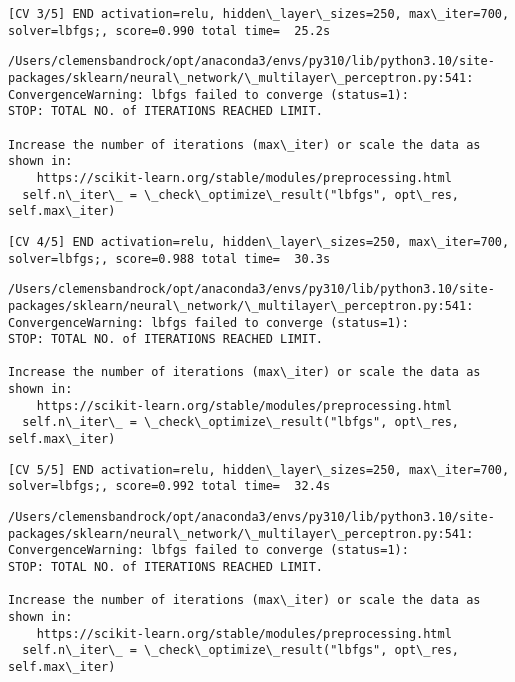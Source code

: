 \documentclass[11pt]{article}
\begin{document}
    \begin{Verbatim}[commandchars=\\\{\}]
[CV 3/5] END activation=relu, hidden\_layer\_sizes=250, max\_iter=700,
solver=lbfgs;, score=0.990 total time=  25.2s
    \end{Verbatim}

    \begin{Verbatim}[commandchars=\\\{\}]
/Users/clemensbandrock/opt/anaconda3/envs/py310/lib/python3.10/site-
packages/sklearn/neural\_network/\_multilayer\_perceptron.py:541:
ConvergenceWarning: lbfgs failed to converge (status=1):
STOP: TOTAL NO. of ITERATIONS REACHED LIMIT.

Increase the number of iterations (max\_iter) or scale the data as shown in:
    https://scikit-learn.org/stable/modules/preprocessing.html
  self.n\_iter\_ = \_check\_optimize\_result("lbfgs", opt\_res, self.max\_iter)
    \end{Verbatim}

    \begin{Verbatim}[commandchars=\\\{\}]
[CV 4/5] END activation=relu, hidden\_layer\_sizes=250, max\_iter=700,
solver=lbfgs;, score=0.988 total time=  30.3s
    \end{Verbatim}

    \begin{Verbatim}[commandchars=\\\{\}]
/Users/clemensbandrock/opt/anaconda3/envs/py310/lib/python3.10/site-
packages/sklearn/neural\_network/\_multilayer\_perceptron.py:541:
ConvergenceWarning: lbfgs failed to converge (status=1):
STOP: TOTAL NO. of ITERATIONS REACHED LIMIT.

Increase the number of iterations (max\_iter) or scale the data as shown in:
    https://scikit-learn.org/stable/modules/preprocessing.html
  self.n\_iter\_ = \_check\_optimize\_result("lbfgs", opt\_res, self.max\_iter)
    \end{Verbatim}

    \begin{Verbatim}[commandchars=\\\{\}]
[CV 5/5] END activation=relu, hidden\_layer\_sizes=250, max\_iter=700,
solver=lbfgs;, score=0.992 total time=  32.4s
    \end{Verbatim}

    \begin{Verbatim}[commandchars=\\\{\}]
/Users/clemensbandrock/opt/anaconda3/envs/py310/lib/python3.10/site-
packages/sklearn/neural\_network/\_multilayer\_perceptron.py:541:
ConvergenceWarning: lbfgs failed to converge (status=1):
STOP: TOTAL NO. of ITERATIONS REACHED LIMIT.

Increase the number of iterations (max\_iter) or scale the data as shown in:
    https://scikit-learn.org/stable/modules/preprocessing.html
  self.n\_iter\_ = \_check\_optimize\_result("lbfgs", opt\_res, self.max\_iter)
    \end{Verbatim}
\end{document}
